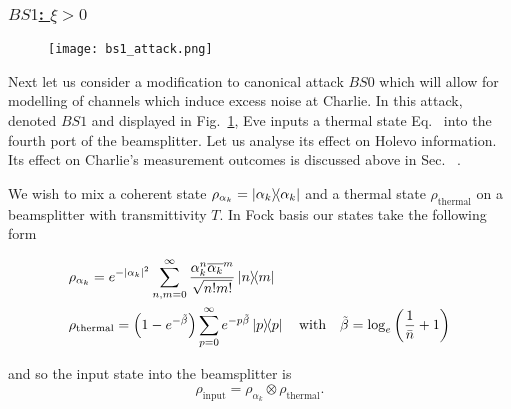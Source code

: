 \subsubsection{\underline{$BS1$: $\xi > 0$}}
\begin{figure}[htp]
\centering
\texttt{[image: bs1\_attack.png]}
\caption{\label{fig:bs1_attack}}
\end{figure}
Next let us consider a modification to canonical attack $BS0$ which will allow for modelling of channels which induce excess noise at Charlie. In this attack, denoted $BS1$ and displayed in Fig.~\ref{fig:bs1_attack}, Eve inputs a thermal state Eq.~ into the fourth port of the beamsplitter. Let us analyse its effect on Holevo information. Its effect on Charlie's measurement outcomes is discussed above in Sec.~ .

We wish to mix a coherent state $\rho_{\alpha_k} = \dyad{\alpha_k}$ and a thermal state $\rho_{\text{thermal}}$ on a beamsplitter with transmittivity $T$. In Fock basis our states take the following form

\begin{align}
&\rho_{\alpha_k} = e^{-\left|\alpha_k\right|^2} \sum_{n, m=0}^{\infty} \frac{\alpha_k^n \overline{\alpha_k}^{m}}{\sqrt{n! m!}} \dyad{n}{m} \notag \\
&\rho_{\text{thermal}} = \left(1 - e^{-\tilde{\beta}}\right) \sum_{p=0}^\infty e^{- p \tilde{\beta}}\dyad{p} \qq{with} \tilde{\beta} = \log_e\left(\frac{1}{\bar{n}} +1\right)
\end{align}

\noindent and so the input state into the beamsplitter is
\begin{equation}
\rho_{\text{input}} = \rho_{\alpha_k} \otimes \rho_{\text{thermal}}.
\end{equation}

